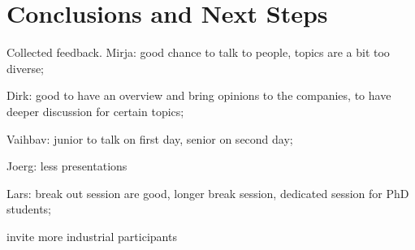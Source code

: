 \section{Conclusions and Next Steps}\label{sec:conclusion}


Collected feedback.  
Mirja: good chance to talk to people, 
topics are a bit too diverse;

Dirk:
good to have an overview and bring opinions to the companies,
to have deeper discussion for certain topics;

Vaihbav:
junior to talk on first day,
senior on second day;

Joerg:
less presentations

Lars:
break out session are good,
longer break session,
dedicated session for PhD students;

invite more industrial participants

